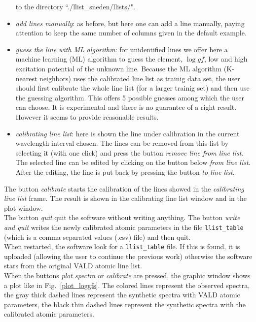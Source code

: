 \documentclass[a4paper,10pt]{article}
\newcommand\loggf{$\log gf$}
\begin{document}
\begin{itemize}
to the directory ``./llist\_sneden/llists/".
%
\item {\em add lines manually}: as before, but here one can add a line
manually, paying attention to keep the same number of columns given in the
default example.
%
\item {\em guess the line with ML algorithm}: for unidentified lines we
offer here a machine learning (ML) algorithm to guess the element, \loggf, 
low and high excitation potential of the unknown line. Because the ML
algorithm (K-nearest neighbors) uses the calibrated line list as trainig data
set, the user should first calibrate the whole line list (for a larger
trainig set) and then use the guessing algorithm. This offers 5 possible
guesses among which the user can choose. It is experimental and there is no
guarantee of a right result. However it seems to provide reasonable results.
%
\item {\em calibrating line list}: here is shown the line under calibration
in the current wavelength interval chosen. The lines can be removed from
this list by selecting it (with one click) and press the button 
{\em remove line from line
list}. The selected line can be edited by clicking on the button below
{\em from line list}. After the editing, the line is put back by pressing the
button {\em to line list}.
%
\end{itemize}

The button {\em calibrate} starts the calibration of the lines showed in the
{\em calibrating line list} frame. The result is shown in the calibrating line
list window and in the plot window.\\
The button {\em quit} quit the software without writing anything.
The button {\em write and quit} writes the newly calibrated atomic parameters
in the file {\tt llist\_table} (which is a comma separated values (.csv) file)
and then quit.\\

When restarted, the software look for a {\tt llist\_table} file. If this is
found, it is uploaded (allowing the user to continue the previous work) otherwise the
software stars from the original VALD atomic line list.\\

When the buttons {\em plot spectra} or {\em calibrate} are pressed, the graphic
window shows a plot like in Fig.~\ref{plot_loggfs}. The colored lines
represent the observed spectra, the gray thick dashed lines represent the
synthetic spectra with VALD atomic parameters, the black thin dashed lines
represent the synthetic spectra with the calibrated atomic parameters.
\end{document}
